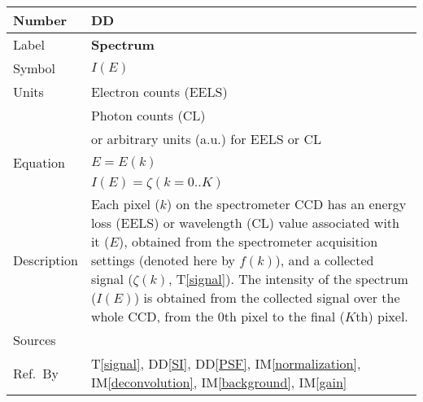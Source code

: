 \documentclass[12pt]{article}
\newcommand{\colAwidth}{0.13\textwidth}
\newcommand{\colBwidth}{0.82\textwidth}
\newcounter{defnum} %
\newcounter{datadefnum} %
\newcommand{\ddref}[1]{DD\ref{#1}}
\newcommand{\tref}[1]{T\ref{#1}}
\newcommand{\iref}[1]{IM\ref{#1}}
\begin{document}
\noindent
\begin{minipage}{\textwidth}
	\renewcommand*{\arraystretch}{1.5}
	\begin{tabular}{| p{\colAwidth} | p{\colBwidth}|}
		\hline
		\rowcolor[gray]{0.9}
		Number& DD{datadefnum}\thedatadefnum \label{Spectrum}\\
		\hline
		Label& \bf Spectrum\\
		\hline
		Symbol & $I(E)$\\
		\hline
		Units & Electron counts (EELS)\\
		& Photon counts (CL)\\
		& or arbitrary units (a.u.) for EELS or CL\\
		  \hline
		  Equation & $E = E(k)$\\
		  & $I(E) = \zeta(k=0..K)$\\
		  \hline
		  Description & Each pixel ($k$) on the spectrometer CCD has an energy loss
(EELS) or wavelength (CL) value associated with it ($E$), obtained from the
spectrometer acquisition settings (denoted here by $f(k)$), and a collected
signal ($\zeta(k)$, \tref{signal}). The intensity of the spectrum ($I(E)$) is
obtained from the collected signal over the whole CCD, from the 0th pixel to the
final ($K$th) pixel.\\
		  \hline
		  Sources & \cite{egerton_introduction_2011} \\
		  \hline
		  Ref.\ By & \tref{signal}, \ddref{SI}, \ddref{PSF}, \iref{normalization},
\iref{deconvolution}, \iref{background}, \iref{gain}\\
		  \hline
	\end{tabular}
\end{minipage}\\

~\newline
\end{document}
